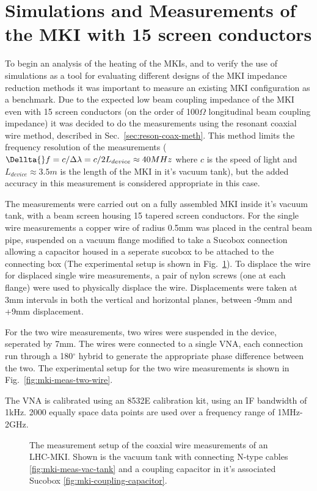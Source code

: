 \section{Simulations and Measurements of the MKI with 15 screen conductors}

To begin an analysis of the heating of the MKIs, and to verify the use of simulations as a tool for evaluating different designs of the MKI impedance reduction methods it was important to measure an existing MKI configuration as a benchmark. Due to the expected low beam coupling impedance of the MKI even with 15 screen conductors (on the order of 100$\Omega$ longitudinal beam coupling impedance) it was decided to do the measurements using the resonant coaxial wire method, described in Sec.~\ref{sec:reson-coax-meth}. This method limits the frequency resolution of the measurements ($\Dellta{}f = c/\Delta \lambda = c/2L_{device} \approx 40MHz$ where $c$ is the speed of light and $L_{device}\approx 3.5m$ is the length of the MKI in it's vacuum tank), but the added accuracy in this measurement is considered appropriate in this case.

The measurements were carried out on a fully assembled MKI inside it's vacuum tank, with a beam screen housing 15 tapered screen conductors. For the single wire measurements a copper wire of radius 0.5mm was placed in the central beam pipe, suspended on a vacuum flange modified to take a Sucobox connection allowing a capacitor housed in a seperate sucobox to be attached to the connecting box (The experimental setup is shown in Fig.~\ref{fig:mki-meas-setup}). To displace the wire for displaced single wire measurements, a pair of nylon screws (one at each flange) were used to physically displace the wire. Displacements were taken at 3mm intervals in both the vertical and horizontal planes, between -9mm and +9mm displacement.

For the two wire measurements, two wires were suspended in the device, seperated by 7mm. The wires were connected to a single VNA, each connection run through a 180$^{\circ}$ hybrid to generate the appropriate phase difference between the two. The experimental setup for the two wire measurements is shown in Fig.~\ref{fig:mki-meas-two-wire}.

The VNA is calibrated using an 8532E calibration kit, using an IF bandwidth of 1kHz. 2000 equally space data points are used over a frequency range of 1MHz-2GHz.

\begin{figure}
\subfigure[]{
\label{fig:mki-meas-vac-tank}
}
\subfigure[]{
\label{fig:mki-coupling-capacitor}
}
\label{fig:mki-meas-setup}
\caption{The measurement setup of the coaxial wire measurements of an LHC-MKI. Shown is the vacuum tank with connecting N-type cables \ref{fig:mki-meas-vac-tank} and a coupling capacitor in it's associated Sucobox \ref{fig:mki-coupling-capacitor}.}
\end{figure}

